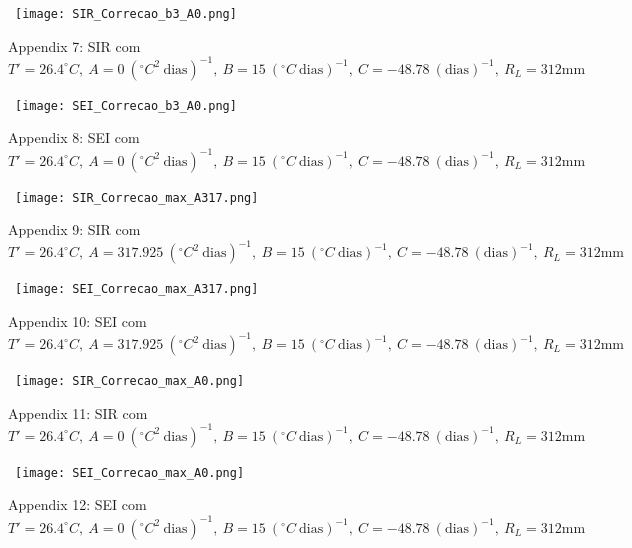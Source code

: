 \documentclass[
	12pt,				%
	oneside,			%
	a4paper,			%
	english,			%
	brazil				%
	]{abntex2}
\begin{document}
\begin{apendicesenv}
\begin{figure}[!ht]
	\centering
	\hbox{\hspace{2.5em} \texttt{[image: SIR\_Correcao\_b3\_A0.png]}}
	\caption*{Appendix 7: SIR com $T'=26.4^\circ C, \ A=0 \ (^\circ C^2 \ \text{dias})^{-1}, \ B=15 \ (^\circ C \ \text{dias})^{-1}, \ C=-48.78 \ (\text{dias})^{-1}, \ R_L=312 \text{mm}$}
\end{figure} 
\begin{figure}[!ht]
	\centering
	\hbox{\hspace{2.0em} \texttt{[image: SEI\_Correcao\_b3\_A0.png]}}
	\caption*{Appendix 8: SEI com $T'=26.4^\circ C, \ A=0 \ (^\circ C^2 \ \text{dias})^{-1}, \ B=15 \ (^\circ C \ \text{dias})^{-1}, \ C=-48.78 \ (\text{dias})^{-1}, \ R_L=312 \text{mm}$}
\end{figure}
\newpage
\begin{figure}[!ht]
	\centering
	\hbox{\hspace{4.0em} \texttt{[image: SIR\_Correcao\_max\_A317.png]}}
	\caption*{Appendix 9: SIR com $T'=26.4^\circ C, \ A=317.925 \ (^\circ C^2 \ \text{dias})^{-1}, \ B=15 \ (^\circ C \ \text{dias})^{-1}, \ C=-48.78 \ (\text{dias})^{-1}, \ R_L=312 \text{mm}$}
\end{figure} 
\begin{figure}[!ht]
	\centering
	\hbox{\hspace{3.5em} \texttt{[image: SEI\_Correcao\_max\_A317.png]}}
	\caption*{Appendix 10: SEI com $T'=26.4^\circ C, \ A=317.925 \ (^\circ C^2 \ \text{dias})^{-1}, \ B=15 \ (^\circ C \ \text{dias})^{-1}, \ C=-48.78 \ (\text{dias})^{-1}, \ R_L=312 \text{mm}$}
\end{figure}
\newpage
\begin{figure}[!ht]
	\centering
	\hbox{\hspace{3.8em} \texttt{[image: SIR\_Correcao\_max\_A0.png]}}
	\caption*{Appendix 11: SIR com $T'=26.4^\circ C, \ A=0 \ (^\circ C^2 \ \text{dias})^{-1}, \ B=15 \ (^\circ C \ \text{dias})^{-1}, \ C=-48.78 \ (\text{dias})^{-1}, \ R_L=312 \text{mm}$}
\end{figure} 
\begin{figure}[!ht]
	\centering
	\hbox{\hspace{3.5em} \texttt{[image: SEI\_Correcao\_max\_A0.png]}}
	\caption*{Appendix 12: SEI com $T'=26.4^\circ C, \ A=0 \ (^\circ C^2 \ \text{dias})^{-1}, \ B=15 \ (^\circ C \ \text{dias})^{-1}, \ C=-48.78 \ (\text{dias})^{-1}, \ R_L=312 \text{mm}$}
\end{figure}
\newpage
\begin{figure}[!ht]

\end{figure}
\end{apendicesenv}
\end{document}
